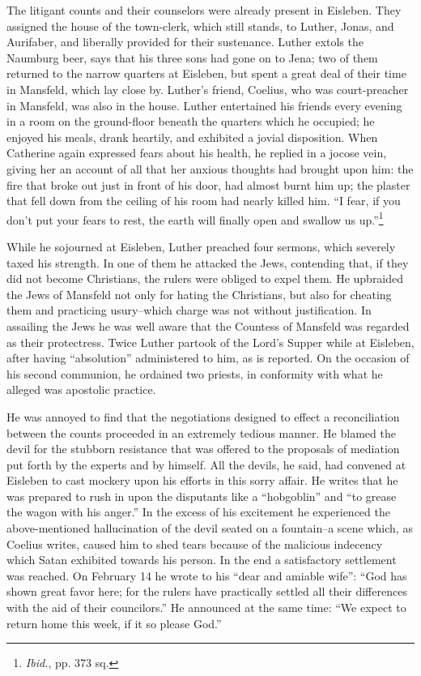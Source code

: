 The litigant counts and their counselors were already present in
Eisleben. They assigned the house of the town-clerk, which still
stands, to Luther, Jonas, and Aurifaber, and liberally provided for
their sustenance. Luther extols the Naumburg beer, says that his
three sons had gone on to Jena; two of them returned to the narrow
quarters at Eisleben, but spent a great deal of their time in Mansfeld,
which lay close by. Luther’s friend, Coelius, who was court-preacher
in Mansfeld, was also in the house. Luther entertained his
friends every evening in a room on the ground-floor beneath the quarters
which he occupied; he enjoyed his meals, drank heartily, and exhibited
a jovial disposition. When Catherine again expressed fears
about his health, he replied in a jocose vein, giving her an account
of all that her anxious thoughts had brought upon him: the fire that
broke out just in front of his door, had almost burnt him up; the
plaster that fell down from the ceiling of his room had nearly killed
him. “I fear, if you don’t put your fears to rest, the earth will finally
open and swallow us up.”\footnote{\textit{Ibid.}, pp. 373 sq.}

While he sojourned at Eisleben, Luther preached four sermons,
which severely taxed his strength. In one of them he attacked the
Jews, contending that, if they did not become Christians, the rulers
were obliged to expel them. He upbraided the Jews of Mansfeld not
only for hating the Christians, but also for cheating them and practicing
usury--which charge was not without justification. In assailing
the Jews he was well aware that the Countess of Mansfeld was regarded
as their protectress. Twice Luther partook of the Lord’s
Supper while at Eisleben, after having “absolution” administered to
him, as is reported. On the occasion of his second communion, he
ordained two priests, in conformity with what he alleged was apostolic practice.

He was annoyed to find that the negotiations designed to effect a
reconciliation between the counts proceeded in an extremely tedious
manner. He blamed the devil for the stubborn resistance that was
offered to the proposals of mediation put forth by the experts and by
himself. All the devils, he said, had convened at Eisleben to cast
mockery upon his efforts in this sorry affair. He writes that he was
prepared to rush in upon the disputants like a “hobgoblin” and “to
grease the wagon with his anger.” In the excess of his excitement
he experienced the above-mentioned hallucination of the devil seated
on a fountain--a scene which, as Coelius writes, caused him to shed
tears because of the malicious indecency which Satan exhibited
towards his person. In the end a satisfactory settlement was reached.
On February 14 he wrote to his “dear and amiable wife”: “God has
shown great favor here; for the rulers have practically settled all
their differences with the aid of their councilors.” He announced at
the same time: “We expect to return home this week, if it so please
God.”

